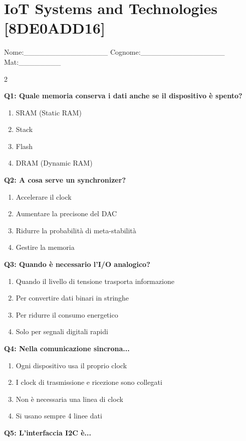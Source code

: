 \documentclass[10pt]{article}
\begin{document}
\newpage

\section*{IoT Systems and Technologies \footnotesize [8DE0ADD16]}
{\footnotesize Nome:\_\_\_\_\_\_\_\_\_\_\_\_\_\_\_\_ Cognome:\_\_\_\_\_\_\_\_\_\_\_\_\_\_\_\_ Mat:\_\_\_\_\_\_\_\_}
\begin{multicols}{2}

\textbf{Q1: Quale memoria conserva i dati anche se il dispositivo è spento?}

\begin{enumerate}[label=\arabic*.]
\item SRAM (Static RAM)
\item Stack
\item Flash
\item DRAM (Dynamic RAM)
\end{enumerate}
\textbf{Q2: A cosa serve un synchronizer?}

\begin{enumerate}[label=\arabic*.]
\item Accelerare il clock
\item Aumentare la precisone del DAC
\item Ridurre la probabilità di meta-stabilità
\item Gestire la memoria
\end{enumerate}
\textbf{Q3: Quando è necessario l’I/O analogico?}

\begin{enumerate}[label=\arabic*.]
\item Quando il livello di tensione trasporta informazione
\item Per convertire dati binari in stringhe
\item Per ridurre il consumo energetico
\item Solo per segnali digitali rapidi
\end{enumerate}
\textbf{Q4: Nella comunicazione sincrona...}

\begin{enumerate}[label=\arabic*.]
\item Ogni dispositivo usa il proprio clock
\item I clock di trasmissione e ricezione sono collegati
\item Non è necessaria una linea di clock
\item Si usano sempre 4 linee dati
\end{enumerate}
\textbf{Q5: L’interfaccia I2C è...}


\end{multicols}
\end{document}
